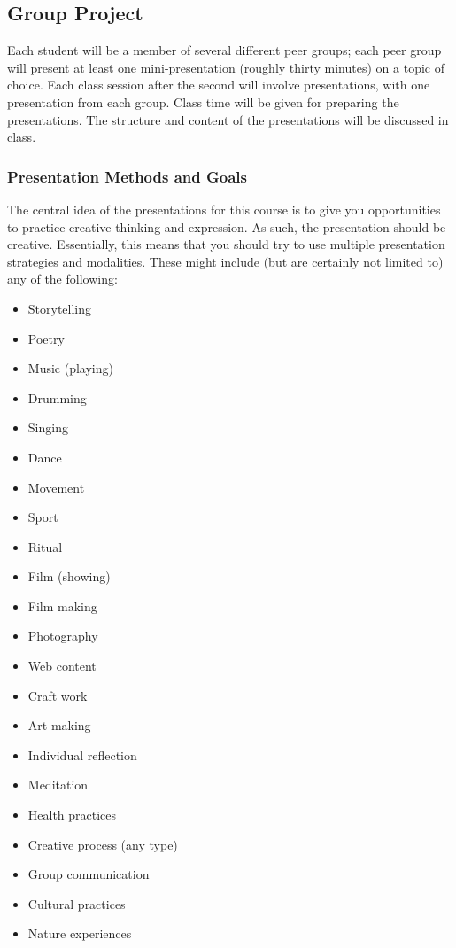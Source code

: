 \documentclass[letterpaper,10pt,headsepline]{scrreprt}
\begin{document}
\subsection{Group Project}

Each student will be a member of several different peer groups; each peer group will present at least one mini-presentation (roughly thirty minutes) on a topic of choice. Each class session after the second will involve presentations, with one presentation from each group. Class time will be given for preparing the presentations. The structure and content of the presentations will be discussed in class.

\subsubsection{Presentation Methods and Goals}

The central idea of the presentations for this course is to give you opportunities to practice creative thinking and expression.  As such, the presentation should be creative. Essentially, this means that you should try to use multiple presentation strategies and modalities. These might include (but are certainly not limited to) any of the following:

 \begin{itemize}
 \item Storytelling
 \item Poetry
 \item Music (playing)
 \item Drumming
 \item Singing
 \item Dance
 \item Movement
 \item Sport
 \item Ritual
 \item Film (showing)
 \item Film making
 \item Photography
 \item Web content
 \item Craft work
 \item Art making
 \item Individual reflection
 \item Meditation
 \item Health practices
 \item Creative process (any type)
 \item Group communication
 \item Cultural practices
 \item Nature experiences
 \end{itemize}
\end{document}

